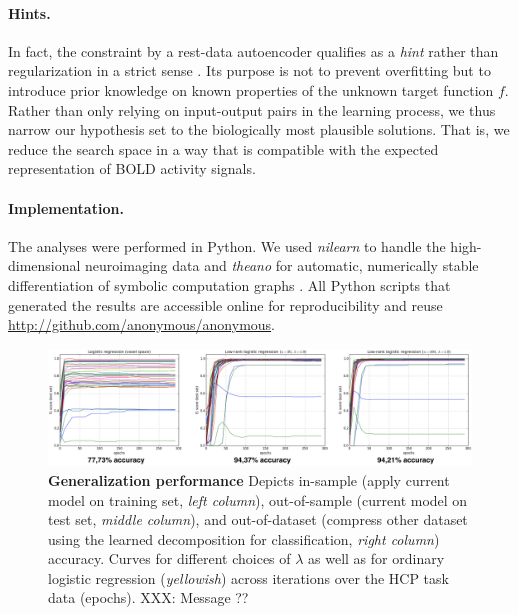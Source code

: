 \documentclass{article} %
\begin{document}
\paragraph{Hints.}
In fact, the constraint by a rest-data autoencoder qualifies as a
\textit{hint}
rather than regularization in a strict sense \cite{abu1994hints}.
Its purpose is not to prevent overfitting but to introduce
prior knowledge on known properties of the unknown target function $f$.
Rather than only relying on input-output pairs in the learning process,
we thus narrow our hypothesis set to the biologically most plausible solutions.
That is, we reduce the search space in a way that
is compatible with the expected representation of BOLD activity signals.

\paragraph{Implementation.}
The analyses were performed in Python.
We used \textit{nilearn} to handle
the high-dimensional neuroimaging data 
\cite{abrah14}
and
\textit{theano} for automatic, numerically stable
differentiation of symbolic computation graphs
\cite{bastien2012theano, bergstra2010theano}.
All Python scripts that generated the results are
accessible online for reproducibility and reuse
\url{http://github.com/anonymous/anonymous}.

\bigskip
\begin{figure}
\begin{centering}
\includegraphics[width=1.00\textwidth]{figures/accuracies.png}
\end{centering}
\caption{\textbf{Generalization performance}
Depicts in-sample (apply current model on training set, \textit{left column}),
out-of-sample (current model on test set, \textit{middle column}),
and out-of-dataset (compress other dataset using the
learned decomposition for classification, \textit{right column}) accuracy.
Curves for different choices of $\lambda$ as well as for ordinary
logistic regression (\textit{yellowish})
across iterations over the HCP task data (epochs).
XXX: Message ??
}
\end{figure}
\end{document}
